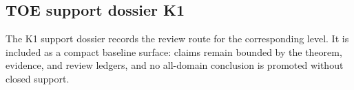 \subsection{TOE support dossier K1}
The K1 support dossier records the review route for the corresponding level. It is included as a compact baseline surface: claims remain bounded by the theorem, evidence, and review ledgers, and no all-domain conclusion is promoted without closed support.
